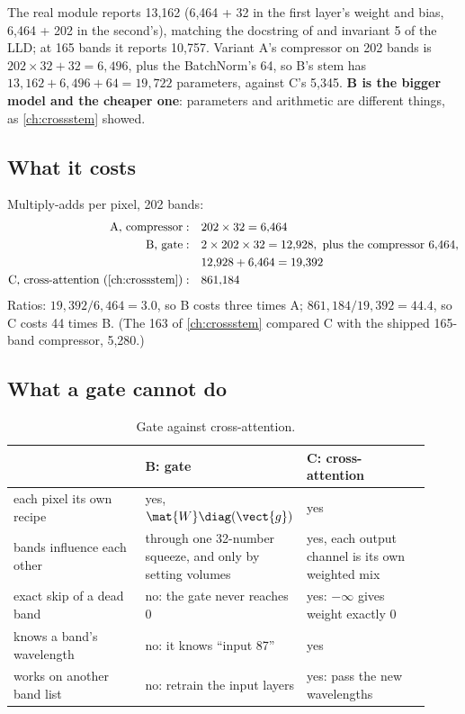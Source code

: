 The real module reports 13,162 (6,464 + 32 in the first layer's weight and bias, 6,464 + 202 in the second's)\tagC{}, matching the docstring of  and invariant 5 of the LLD; at 165 bands it reports 10,757. Variant A's compressor on 202 bands is $202\times32 + 32 = 6{,}496$, plus the BatchNorm's 64, so B's stem has $13{,}162 + 6{,}496 + 64 = 19{,}722$ parameters, against C's 5,345. \textbf{B is the bigger model and the cheaper one}: parameters and arithmetic are different things, as \cref{ch:crossstem} showed.

\subsection{What it costs}

Multiply-adds per pixel, 202 bands:
\begin{align*}
  \text{A, compressor}:&\quad 202\times32 = 6{,}464\\
  \text{B, gate}:&\quad 2\times202\times32 = 12{,}928, \text{ plus the compressor } 6{,}464,\\
  &\quad 12{,}928+6{,}464 = 19{,}392\\
  \text{C, cross-attention (\cref{ch:crossstem})}:&\quad 861{,}184
\end{align*}
Ratios: $19{,}392/6{,}464 = 3.0$, so B costs three times A; $861{,}184/19{,}392 = 44.4$, so C costs 44 times B. (The 163 of \cref{ch:crossstem} compared C with the shipped 165-band compressor, 5,280.)

\subsection{What a gate cannot do}\label{sec:specdecoder:gatelimits}

\begin{table}[htbp]\centering
\caption{Gate against cross-attention.}\label{tab:specdecoder:gatevsc}
\begin{tabular}{p{0.32\linewidth}p{0.3\linewidth}p{0.3\linewidth}}\toprule
 & B: gate & C: cross-attention\\\midrule
each pixel its own recipe & yes, $\mat{W}\diag(\vect{g})$ & yes\\
bands influence each other & through one 32-number squeeze, and only by setting volumes & yes, each output channel is its own weighted mix\\
exact skip of a dead band & no: the gate never reaches 0 & yes: $-\infty$ gives weight exactly 0\\
knows a band's wavelength & no: it knows ``input 87'' & yes\\
works on another band list & no: retrain the input layers & yes: pass the new wavelengths\\\bottomrule
\end{tabular}
\end{table}

